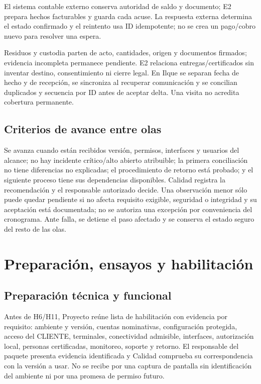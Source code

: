 El sistema contable externo conserva autoridad de saldo y documento; E2 prepara hechos facturables y guarda cada acuse. La respuesta externa determina el estado confirmado y el reintento usa ID idempotente; no se crea un pago/cobro nuevo para resolver una espera.

Residuos y custodia parten de acto, cantidades, origen y documentos firmados; evidencia incompleta permanece pendiente. E2 relaciona entregas/certificados sin inventar destino, consentimiento ni cierre legal. En Ilque se separan fecha de hecho y de recepción, se sincroniza al recuperar comunicación y se concilian duplicados y secuencia por ID antes de aceptar delta. Una visita no acredita cobertura permanente.

\subsection{Criterios de avance entre olas}
Se avanza cuando están recibidos versión, permisos, interfaces y usuarios del alcance; no hay incidente crítico/alto abierto atribuible; la primera conciliación no tiene diferencias no explicadas; el procedimiento de retorno está probado; y el siguiente proceso tiene sus dependencias disponibles. Calidad registra la recomendación y el responsable autorizado decide. Una observación menor sólo puede quedar pendiente si no afecta requisito exigible, seguridad o integridad y su aceptación está documentada; no se autoriza una excepción por conveniencia del cronograma. Ante falla, se detiene el paso afectado y se conserva el estado seguro del resto de las olas.

\section{Preparación, ensayos y habilitación}\label{sec:t18-preparacion}
\subsection{Preparación técnica y funcional}
Antes de H6/H11, Proyecto reúne lista de habilitación con evidencia por requisito: ambiente y versión, cuentas nominativas, configuración protegida, acceso del CLIENTE, terminales, conectividad admisible, interfaces, autorización local, personas certificadas, monitoreo, soporte y retorno. El responsable del paquete presenta evidencia identificada y Calidad comprueba su correspondencia con la versión a usar. No se recibe por una captura de pantalla sin identificación del ambiente ni por una promesa de permiso futuro.


